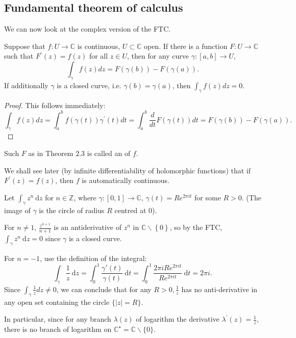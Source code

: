 \documentclass[egregdoesnotlikesansseriftitles,a4paper]{scrartcl}
\begin{document}
\subsection{Fundamental theorem of calculus}
We can now look at the complex version of the FTC.
\begin{theorem}\label{ftc}
     Suppose that $f: U \rightarrow \mathbb{C}$ is continuous, $U \subset \mathbb{C}$ open. If there is a function $F: U \rightarrow \mathbb{C}$ such that $F^{\prime}(z)=f(z)$ for all $z \in U$, then for any curve $\gamma:[a, b] \rightarrow U$,
     $$
     \int_{\gamma} f(z) d z=F(\gamma(b))-F(\gamma(a)) .
     $$
     If additionally $\gamma$ is a closed curve, i.e. $\gamma(b)=\gamma(a)$, then $\int_{\gamma} f(z) d z=0$.
\end{theorem}
\begin{proof}
     This follows immediately:
      \[
          \int_{\gamma} f(z) d z=\int_{a}^{b} f(\gamma(t)) \gamma^{\prime}(t) d t=\int_{a}^{b} \frac{d}{d t} F(\gamma(t)) d t=F(\gamma(b))-F(\gamma(a))
      .\] 
\end{proof}
\begin{remark}
     Such $F$ as in Theorem $2.3$ is called an  of $f$.
     
     We shall see later (by infinite differentiability of holomorphic functions) that if $F^{\prime}(z)=f(z)$, then $f$ is automatically continuous.
\end{remark}
\begin{example*}
      Let $\int_{\gamma}^{}z^{n} \ \mathrm{d}z $ for $n \in \mathbb{Z}$, where $\gamma: [0,1]\rightarrow \mathbb{C}$, $\gamma (t)=R e^{2\pi it}$ for some $R>0$. (The image of $\gamma$ is the circle of radius $R$ centred at 0). 

      For $n \neq 1$, $ \frac{z^{n+1}}{n+1}$ is an antiderivative of $z^{n}$ in $\mathbb{C}\backslash \left\{0\right\}$, so by the FTC, $\int_{\gamma}^{}z^{n} \ \mathrm{d}z =0$ since $\gamma$ is a closed curve.

      For $n=-1$, use the definition of the integral: \[
          \int_{\gamma}^{}\frac{1}{z} \ \mathrm{d}z =\int_{0}^{1} \frac{\gamma' (t)}{\gamma (t)} \ \mathrm{d}t=\int_{0}^{1} \frac{2 \pi iR e^{2\pi it}}{R e^{2\pi it}} \ \mathrm{d}t= 2 \pi i
      .\] 
      Since $\int_{\gamma} \frac{1}{z} d z \neq 0$, we can conclude that for any $R>0, \frac{1}{z}$ has no anti-derivative in any open set containing the circle $\{|z|=R\}$.

      In particular, since for any branch $\lambda(z)$ of logarithm the derivative $\lambda^{\prime}(z)=\frac{1}{z}$, there is no branch of logarithm on $\mathbb{C}^{\star}=\mathbb{C} \backslash\{0\} .$
\end{example*}
\end{document}
